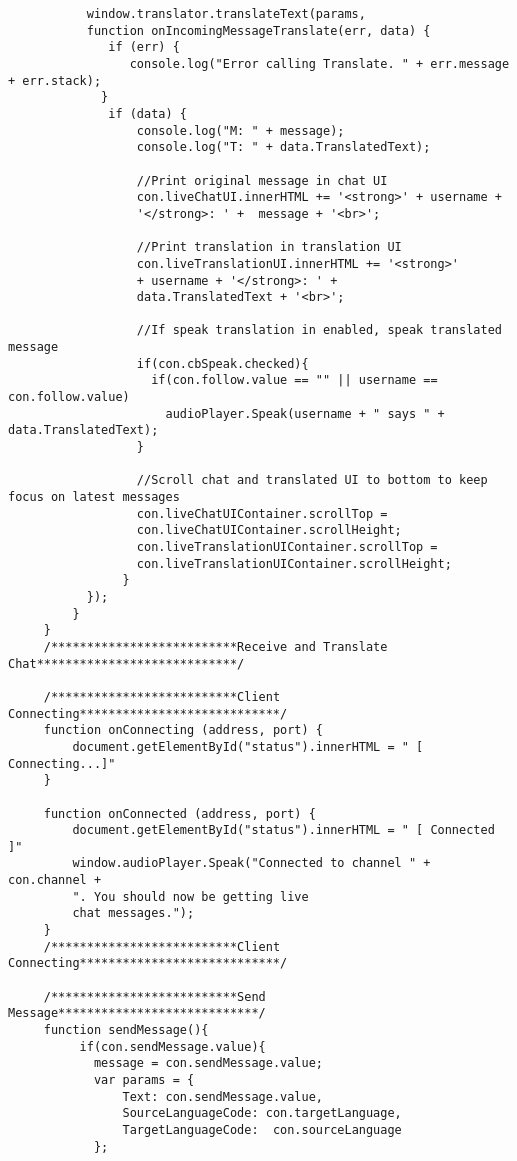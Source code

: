 \documentclass[runningheads]{llncs}
\begin{document}
{\begin{verbatim}
           window.translator.translateText(params, 
           function onIncomingMessageTranslate(err, data) {
              if (err) {
                 console.log("Error calling Translate. " + err.message + err.stack);
             }
              if (data) {
                  console.log("M: " + message);
                  console.log("T: " + data.TranslatedText);

                  //Print original message in chat UI
                  con.liveChatUI.innerHTML += '<strong>' + username + 
                  '</strong>: ' +  message + '<br>';

                  //Print translation in translation UI
                  con.liveTranslationUI.innerHTML += '<strong>' 
                  + username + '</strong>: ' +
                  data.TranslatedText + '<br>';

                  //If speak translation in enabled, speak translated message
                  if(con.cbSpeak.checked){
                    if(con.follow.value == "" || username == con.follow.value)
                      audioPlayer.Speak(username + " says " + data.TranslatedText);
                  }

                  //Scroll chat and translated UI to bottom to keep focus on latest messages
                  con.liveChatUIContainer.scrollTop = 
                  con.liveChatUIContainer.scrollHeight;
                  con.liveTranslationUIContainer.scrollTop = 
                  con.liveTranslationUIContainer.scrollHeight;
                }
           });
         }
     }
     /**************************Receive and Translate Chat****************************/

     /**************************Client Connecting****************************/
     function onConnecting (address, port) {
         document.getElementById("status").innerHTML = " [ Connecting...]"
     }

     function onConnected (address, port) {
         document.getElementById("status").innerHTML = " [ Connected ]"
         window.audioPlayer.Speak("Connected to channel " + con.channel +
         ". You should now be getting live
         chat messages.");
     }
     /**************************Client Connecting****************************/

     /**************************Send Message****************************/
     function sendMessage(){
          if(con.sendMessage.value){
            message = con.sendMessage.value;
            var params = {
                Text: con.sendMessage.value,
                SourceLanguageCode: con.targetLanguage,
                TargetLanguageCode:  con.sourceLanguage
            };


\end{verbatim}}
\end{document}
